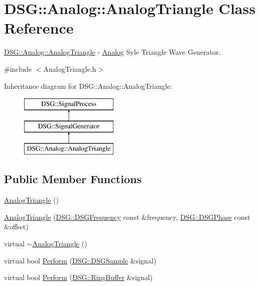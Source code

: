 \hypertarget{class_d_s_g_1_1_analog_1_1_analog_triangle}{\section{D\+S\+G\+:\+:Analog\+:\+:Analog\+Triangle Class Reference}
\label{class_d_s_g_1_1_analog_1_1_analog_triangle}
}


\hyperlink{class_d_s_g_1_1_analog_1_1_analog_triangle}{D\+S\+G\+::\+Analog\+::\+Analog\+Triangle} -\/ \hyperlink{namespace_d_s_g_1_1_analog}{Analog} Syle Triangle Wave Generator.  




{\ttfamily \#include $<$Analog\+Triangle.\+h$>$}

Inheritance diagram for D\+S\+G\+:\+:Analog\+:\+:Analog\+Triangle\+:\begin{figure}[H]
\begin{center}
\leavevmode
\includegraphics[height=3.000000cm]{class_d_s_g_1_1_analog_1_1_analog_triangle}
\end{center}
\end{figure}
\subsection*{Public Member Functions}
\begin{DoxyCompactItemize}
\item 
\hyperlink{class_d_s_g_1_1_analog_1_1_analog_triangle_a2fe1a7a29eb9472323a2a1c0d0696e55}{Analog\+Triangle} ()
\item 
\hyperlink{class_d_s_g_1_1_analog_1_1_analog_triangle_a75c0a8b20e1843b35de3944da11c75ed}{Analog\+Triangle} (\hyperlink{namespace_d_s_g_a4315a061386fa1014fda09b15d3a6973}{D\+S\+G\+::\+D\+S\+G\+Frequency} const \&frequency, \hyperlink{namespace_d_s_g_a44431ce1eb0a7300efdd207bc879e52c}{D\+S\+G\+::\+D\+S\+G\+Phase} const \&offset)
\item 
virtual \hyperlink{class_d_s_g_1_1_analog_1_1_analog_triangle_af6e127d2fb623afad9b172e7c8b3c656}{$\sim$\+Analog\+Triangle} ()
\item 
virtual bool \hyperlink{class_d_s_g_1_1_analog_1_1_analog_triangle_a9b2484f3eb4c4ad545cb88b8833be124}{Perform} (\hyperlink{namespace_d_s_g_ac39a94cd27ebcd9c1e7502d0c624894a}{D\+S\+G\+::\+D\+S\+G\+Sample} \&signal)
\item 
virtual bool \hyperlink{class_d_s_g_1_1_analog_1_1_analog_triangle_a568c994e0f83f6a01d813357259a8f37}{Perform} (\hyperlink{class_d_s_g_1_1_ring_buffer}{D\+S\+G\+::\+Ring\+Buffer} \&signal)
\end{DoxyCompactItemize}
